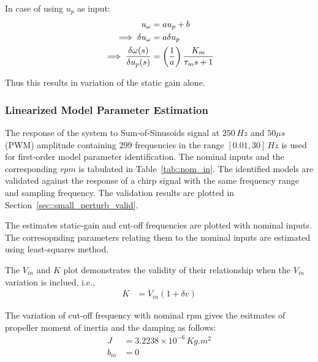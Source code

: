 In case of using $u_p$ as input:
\begin{align*}
    u_\omega &= a u_p + b\\
    \implies \delta u_\omega &= a \delta u_p\\
    \implies \frac{\delta \omega(s)}{\delta u_p(s)} &= \left( \frac{1}{a} \right)\frac{K_m}{\tau_m s + 1}
\end{align*}

Thus this results in variation of the static gain alone.


\subsubsection{Linearized Model Parameter Estimation}
The response of the system to Sum-of-Sinusoids signal at $250 \, Hz$ and $50 \mu s$ (PWM) amplitude containing $299$ frequencies in the range $[0.01, 30]\,Hz$ is used for first-order model parameter identification. The nominal inputs and the corresponding $rpm$ is tabulated in Table~\ref{tab::nom_in}. The identified models are validated against the response of a chirp signal with the same frequency range and sampling frequency. The validation results are plotted in Section~\ref{sec::small_perturb_valid}.

The estimates static-gain and cut-off frequencies are plotted with nominal inputs. The corresopnding parameters relating them to the nominal inputs are estimated using least-squares method.

The $V_{in}$ and $K$ plot demonstrates the validity of their relationship when the $V_{in}$ variation is inclued, i.e.,
\begin{align*}
    K &= V_{in} (1 + \delta v)
\end{align*}

The variation of cut-off frequency with nominal rpm gives the esitmates of propeller moment of inertia and the damping as follows:
\begin{align*}
    J &= 3.2238 \times 10^{-6} \, Kg .m^2\\
    b_m &= 0
\end{align*}

